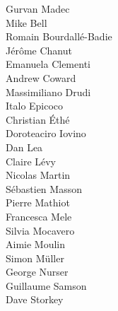 
 Gurvan Madec                \\
                            Mike Bell                   \\
 Romain Bourdall\'{e}-Badie  \\
                            J\'{e}r\^{o}me Chanut       \\
 Emanuela Clementi           \\
 Andrew Coward               \\
 Massimiliano Drudi          \\
 Italo Epicoco               \\
                            Christian \'{E}th\'{e}      \\
 Doroteaciro Iovino          \\
                            Dan Lea                     \\
 Claire L\'{e}vy             \\
                            Nicolas Martin              \\
 S\'{e}bastien Masson        \\
                            Pierre Mathiot              \\
 Francesca Mele              \\
 Silvia Mocavero             \\
 Aimie Moulin                \\
                            Simon M\"{u}ller            \\
                            George Nurser               \\
 Guillaume Samson            \\
                            Dave Storkey                \\
